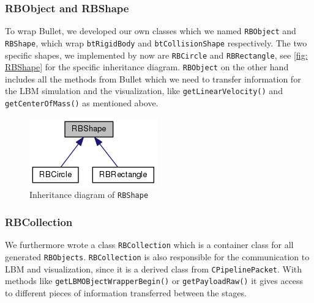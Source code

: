 \subsubsection*{RBObject and RBShape}
To wrap Bullet, we developed our own classes which we named \texttt{RBObject} and \texttt{RBShape}, which wrap \texttt{btRigidBody} and \texttt{btCollisionShape} respectively. The two specific shapes, we implemented by now are \texttt{RBCircle} and \texttt{RBRectangle}, see \autoref{fig: RBShape} for the specific inheritance diagram. 
\texttt{RBObject} on the other hand includes all the methods from Bullet which we need to transfer information for the LBM simulation and the visualization, like \texttt{getLinearVelocity()} and \texttt{getCenterOfMass()} as mentioned above. 
\begin{figure}[ht]
\centering
\includegraphics[scale=0.5]{img/RigidBodies/RBShapeGraph.png}
\caption{Inheritance diagram of \texttt{RBShape}}
\label{fig: RBShape}
\end{figure}

\subsubsection*{RBCollection}
We furthermore wrote a class \texttt{RBCollection} which is a container class for all generated \texttt{RBObjects}. \texttt{RBCollection} is also responsible for the communication to LBM and visualization, since it is a derived class from \texttt{CPipelinePacket}. With methods like \texttt{getLBMOBjectWrapperBegin()} or \texttt{getPayloadRaw()} it gives access to different pieces of information transferred between the stages. 

